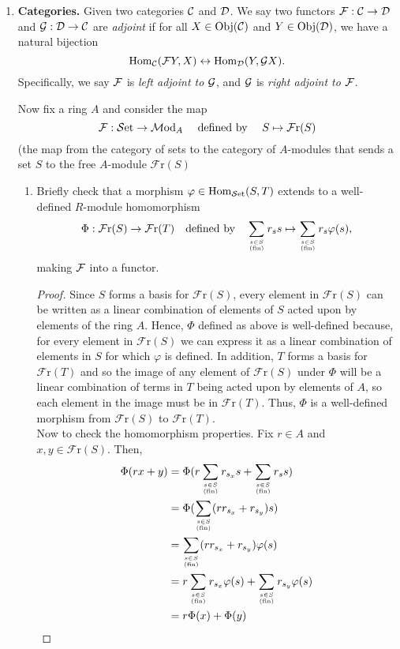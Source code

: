 \documentclass[11pt, reqno]{amsart}
\theoremstyle{plain}
\theoremstyle{definition}
\theoremstyle{example}
\def\Hom{\mathrm{Hom}}
\def\Fr{\mathcal{F}\mathrm{r}}
\def\f{\varphi}
\def\Obj{\mathrm{Obj}}
\def\Set{{\cS\mathrm{et}}}
\def\Set{{\cS\mathrm{et}}}
\def\Mod{{\cM\mathrm{od}}}
\begin{document}
\begin{enumerate}[1.]
\item  \textbf{Categories.} Given two categories $\mathcal{C}$ and $\mathcal{D}$. We say two functors $\mathcal{F}: \mathcal{C} \to \mathcal{D}$ and $\mathcal{G}: \mathcal{D} \to \mathcal{C}$ are \emph{adjoint} if for all $X \in \Obj(\cC)$ and $Y \in \Obj(\cD)$, we have a natural bijection 
	$$\Hom_{\cC}(\cF Y,X) \leftrightarrow \Hom_{\cD}(Y,\cG X).$$
	Specifically, we say $\mathcal{F}$ is \emph{left adjoint to $\mathcal{G}$}, and $\mathcal{G}$ is \emph{right adjoint to $\mathcal{F}$}. 
	
	
Now fix a ring $A$ and consider the map
$$\cF: \Set \to \Mod_A \quad \text{ defined by } \quad S \mapsto \Fr(S)$$ 
(the map from the category of sets to the category of $A$-modules that sends a set $S$ to the free $A$-module $\Fr(S)$ 

\begin{enumerate}
\item Briefly check that a morphism $\f \in \Hom_\Set(S, T)$ extends to a well-defined $R$-module homomorphism 
$$\Phi: \Fr(S) \to \Fr(T) \quad \text{defined by} \quad 
	\sum_{s \in S \atop \text{(fin)}} r_s s \mapsto \sum_{s \in S \atop \text{(fin)}} r_s \f(s),$$ 
making $\mathcal{F}$ into a functor.  

\begin{proof}
Since $S$ forms a basis for $\Fr(S)$, every element in $\Fr(S)$ can be written as a linear combination of elements of $S$ acted upon by elements of the ring $A$. Hence, $\Phi$ defined as above is well-defined because, for every element in $\Fr(S)$ we can express it as a linear combination of elements in $S$ for which $\varphi$ is defined. In addition, $T$ forms a basis for $\Fr(T)$ and so the image of any element of $\Fr(S)$ under $\Phi$ will be a linear combination of terms in $T$ being acted upon by elements of $A$, so each element in the image must be in $\Fr(T)$. Thus, $\Phi$ is a well-defined morphism from $\Fr(S)$ to $\Fr(T)$.\\

Now to check the homomorphism properties. Fix $r \in A$ and $x, y \in \Fr(S)$. Then,
\begin{align*}
\Phi(rx + y) &= \Phi(r \sum_{s \in S \atop \text{(fin)}} r_{s_x} s +  \sum_{s \in S \atop \text{(fin)}} r_{s} s)\\
&=  \Phi(\sum_{s \in S \atop \text{(fin)}} (rr_{s_x} + r_{s_y})s)\\
&= \sum_{s \in S \atop \text{(fin)}} (rr_{s_x} + r_{s_y}) \varphi(s)\\
&= r \sum_{s \in S \atop \text{(fin)}} r_{s_x} \varphi(s) + \sum_{s \in S \atop \text{(fin)}} r_{s_y} \varphi(s)\\
&= r\Phi(x) + \Phi(y)
\end{align*}


\end{proof}
\end{enumerate}
\end{enumerate}
\end{document}
